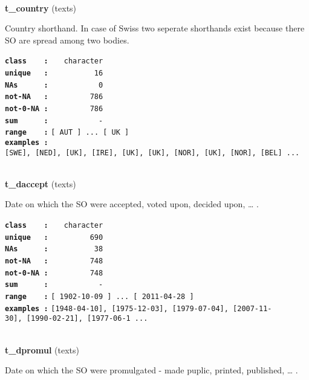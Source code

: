 \documentclass[]{article}
\begin{document}
~

\textbf{t\_country} (texts)

Country shorthand. In case of Swiss two seperate shorthands exist
because there SO are spread among two bodies.

\textbf{\texttt{class\ \ \ \ :}} \texttt{~~~character}\\
\textbf{\texttt{unique\ \ \ :}} \texttt{~~~~~~~~~~16}\\
\textbf{\texttt{NAs\ \ \ \ \ \ :}} \texttt{~~~~~~~~~~~0}\\
\textbf{\texttt{not-NA\ \ \ :}} \texttt{~~~~~~~~~786}\\
\textbf{\texttt{not-0-NA\ :}} \texttt{~~~~~~~~~786}\\
\textbf{\texttt{sum\ \ \ \ \ \ :}} \texttt{~~~~~~~~~~~-}\\
\textbf{\texttt{range\ \ \ \ :}}
\texttt{{[}\ AUT\ {]}\ ...\ {[}\ UK\ {]}}\\
\textbf{\texttt{examples\ :}}
\texttt{{[}SWE{]},\ {[}NED{]},\ {[}UK{]},\ {[}IRE{]},\ {[}UK{]},\ {[}UK{]},\ {[}NOR{]},\ {[}UK{]},\ {[}NOR{]},\ {[}BEL{]}\ ...}\\

~

\textbf{t\_daccept} (texts)

Date on which the SO were accepted, voted upon, decided upon, \ldots{} .

\textbf{\texttt{class\ \ \ \ :}} \texttt{~~~character}\\
\textbf{\texttt{unique\ \ \ :}} \texttt{~~~~~~~~~690}\\
\textbf{\texttt{NAs\ \ \ \ \ \ :}} \texttt{~~~~~~~~~~38}\\
\textbf{\texttt{not-NA\ \ \ :}} \texttt{~~~~~~~~~748}\\
\textbf{\texttt{not-0-NA\ :}} \texttt{~~~~~~~~~748}\\
\textbf{\texttt{sum\ \ \ \ \ \ :}} \texttt{~~~~~~~~~~~-}\\
\textbf{\texttt{range\ \ \ \ :}}
\texttt{{[}\ 1902-10-09\ {]}\ ...\ {[}\ 2011-04-28\ {]}}\\
\textbf{\texttt{examples\ :}}
\texttt{{[}1948-04-10{]},\ {[}1975-12-03{]},\ {[}1979-07-04{]},\ {[}2007-11-30{]},\ {[}1990-02-21{]},\ {[}1977-06-1\ ...}\\

~

\textbf{t\_dpromul} (texts)

Date on which the SO were promulgated - made puplic, printed, published,
\ldots{} .
\end{document}
